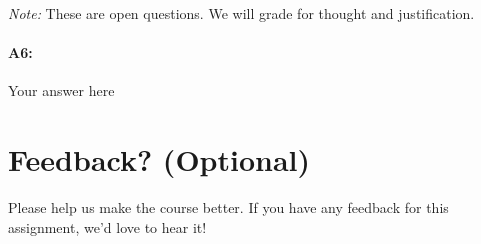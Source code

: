 \emph{Note:} These are open questions. We will grade for thought and justification. 


 \paragraph{A6:} Your answer here



\pagebreak
\section*{Feedback? (Optional)}
Please help us make the course better. If you have any feedback for this assignment, we'd love to hear it!

